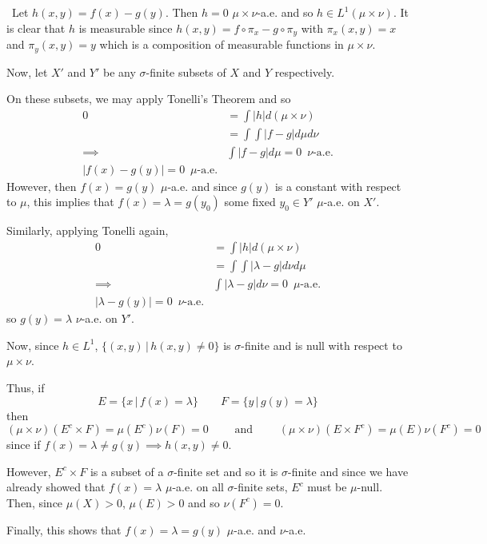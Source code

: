 \documentclass[12pt]{Homework}
\begin{document}
\begin{solution}$\,$
Let $h(x,y)=f(x)-g(y)$. Then $h=0$ $\mu\times\nu$-a.e. and so $h\in L^1(\mu\times\nu)$. It is clear that $h$ is measurable since $h(x,y)=f\circ\pi_x-g\circ\pi_y$ with $\pi_x(x,y)=x$ and $\pi_y(x,y)=y$ which is a composition of measurable functions in $\mu\times\nu$.

Now, let $X'$ and $Y'$ be any $\sigma$-finite subsets of $X$ and $Y$ respectively. 

On these subsets, we may apply Tonelli's Theorem and so \begin{align*}
    0&=\int|h|d(\mu\times\nu)\\
    &=\int\int|f-g|d\mu d\nu\\
    \implies &\int|f-g|d\mu=0\,\,\, \nu\text{-a.e.}\\
    |f(x)-g(y)|=0\,\,\,\mu\text{-a.e.}
\end{align*}
However, then $f(x)=g(y)$ $\mu$-a.e. and since $g(y)$ is a constant with respect to $\mu$, this implies that $f(x)=\lambda=g(y_0)$ some fixed $y_0\in Y'$ $\mu$-a.e. on $X'$.

Similarly, applying Tonelli again, \begin{align*}
    0&=\int|h|d(\mu\times\nu)\\
    &=\int\int|\lambda-g|d\nu d\mu\\
    \implies &\int|\lambda-g|d\nu=0\,\,\, \mu\text{-a.e.}\\
    |\lambda-g(y)|=0\,\,\,\nu\text{-a.e.}
\end{align*}
so $g(y)=\lambda$ $\nu$-a.e. on $Y'$.

Now, since $h\in L^1$, $\{(x,y)\,|\,h(x,y)\not=0\}$ is $\sigma$-finite and is null with respect to $\mu\times\nu$.

Thus, if $$E=\{x\,|\,f(x)=\lambda\}\qquad F=\{y\,|\, g(y)=\lambda\}$$ then $$(\mu\times\nu)(E^c\times F)=\mu(E^c)\nu(F)=0\qquad\text{ and }\qquad (\mu\times\nu)(E\times F^c)=\mu(E)\nu(F^c)=0$$ since if $f(x)=\lambda\not=g(y)\implies h(x,y)\not=0$.

However, $E^c\times F$ is a subset of a $\sigma$-finite set and so it is $\sigma$-finite and since we have already showed that $f(x)=\lambda$ $\mu$-a.e. on all $\sigma$-finite sets, $E^c$ must be $\mu$-null. Then, since $\mu(X)>0$, $\mu(E)>0$ and so $\nu(F^c)=0$.

Finally, this shows that $f(x)=\lambda=g(y)$ $\mu$-a.e. and $\nu$-a.e.
\end{solution}
\vspace{0.5cm}
\end{document}
